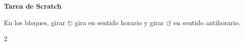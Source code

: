 \documentclass[11pt,a4paper]{article}
\begin{document}
\frenchspacing
{\Large\bfseries Tarea de Scratch}
\vspace{6pt}

En los bloques, girar $\circlearrowright$ gira en sentido horario y girar $\circlearrowleft$ en sentido antihorario.
\vspace{10pt}
\begin{multicols}{2}
\begin{enumerate}[label=\textbf{\arabic*.},leftmargin=*,itemsep=10pt,topsep=0pt]
\end{enumerate}
\end{multicols}
\end{document}
